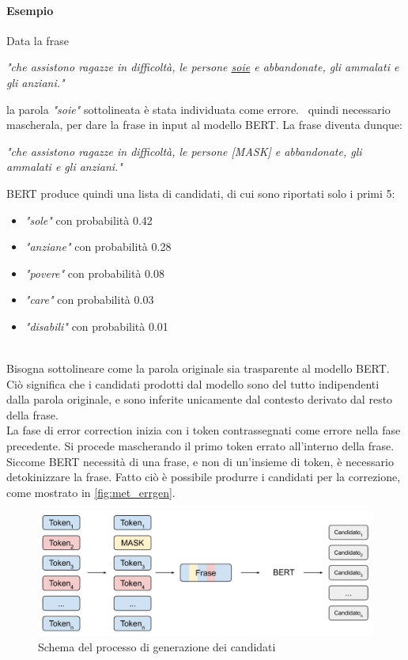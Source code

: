 \paragraph{Esempio} Data la frase 
\begin{center}
\textit{"che assistono ragazze in difficoltà, le persone \underline{soie} e abbandonate, gli ammalati e gli anziani."}
\end{center}
la parola \textit{"soie"} sottolineata è stata individuata come errore. \E\ quindi necessario mascherala, per dare la frase in input al modello BERT. La frase diventa dunque:
\begin{center}
\textit{"che assistono ragazze in difficoltà, le persone [MASK] e abbandonate, gli ammalati e gli anziani."}
\end{center}
BERT produce quindi una lista di candidati, di cui sono riportati solo i primi 5:
\begin{itemize}
\item \textit{"sole"} con probabilità 0.42
\item \textit{"anziane"} con probabilità 0.28
\item \textit{"povere"} con probabilità 0.08
\item \textit{"care"} con probabilità 0.03
\item \textit{"disabili"} con probabilità 0.01
\end{itemize}
\ \\
Bisogna sottolineare come la parola originale sia trasparente al modello BERT. Ciò significa che i candidati prodotti dal modello sono del tutto indipendenti dalla parola originale, e sono inferite unicamente dal contesto derivato dal resto della frase.\\
La fase di error correction inizia con i token contrassegnati come errore nella fase precedente. Si procede mascherando il primo token errato all'interno della frase. Siccome BERT necessità di una frase, e non di un'insieme di token, è necessario detokinizzare la frase. Fatto ciò è possibile produrre i candidati per la correzione, come mostrato in \autoref{fig:met_errgen}.

\begin{figure}[H]
\centering
\includegraphics[width=\textwidth]{immagini/metodologia/generazione_candidati}
\caption{Schema del processo di generazione dei candidati}
\label{fig:met_errgen}
\end{figure}


